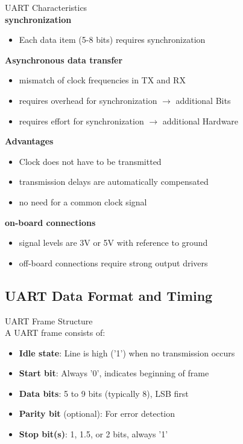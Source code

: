 \begin{concept}{UART Characteristics}
    \vspace{2mm}\\
    \textbf{synchronization}
    \begin{itemize}
        \item Each data item (5-8 bits) requires synchronization
    \end{itemize}
    \vspace{2mm}

    \textbf{Asynchronous data transfer}
    \begin{itemize}
        \item mismatch of clock frequencies in TX and RX
        \item requires overhead for synchronization $\rightarrow$ additional Bits
        \item requires effort for synchronization $\rightarrow$ additional Hardware
    \end{itemize}
    \vspace{2mm}

    \textbf{Advantages}
    \begin{itemize}
        \item Clock does not have to be transmitted
        \item transmission delays are automatically compensated
        \item no need for a common clock signal
    \end{itemize}
    \vspace{2mm}
    
    \textbf{on-board connections}
    \begin{itemize}
        \item signal levels are 3V or 5V with reference to ground
        \item off-board connections require strong output drivers
    \end{itemize}
\end{concept}

\multend

\subsection{UART Data Format and Timing}


\begin{definition}{UART Frame Structure}\\
A UART frame consists of:
\begin{itemize}
    \item \textbf{Idle state}: Line is high ('1') when no transmission occurs
    \item \textbf{Start bit}: Always '0', indicates beginning of frame
    \item \textbf{Data bits}: 5 to 9 bits (typically 8), LSB first
    \item \textbf{Parity bit} (optional): For error detection
    \item \textbf{Stop bit(s)}: 1, 1.5, or 2 bits, always '1'
\end{itemize}
\end{definition}

